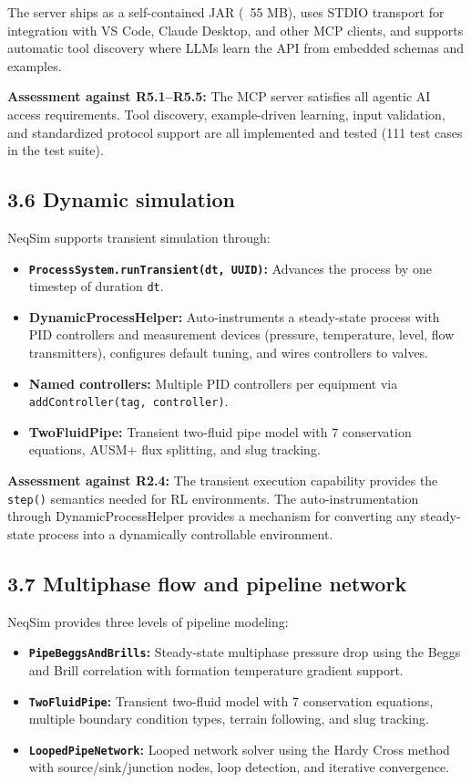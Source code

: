 \documentclass[review,3p]{custom}
\begin{document}
The server ships as a self-contained JAR (~55 MB), uses STDIO transport for integration with VS Code, Claude Desktop, and other MCP clients, and supports automatic tool discovery where LLMs learn the API from embedded schemas and examples.

\textbf{Assessment against R5.1--R5.5:} The MCP server satisfies all agentic AI access requirements. Tool discovery, example-driven learning, input validation, and standardized protocol support are all implemented and tested (111 test cases in the test suite).

\subsection{3.6 Dynamic simulation}

NeqSim supports transient simulation through:

\begin{itemize}
  \item \textbf{\texttt{ProcessSystem.runTransient(dt, UUID)}:} Advances the process by one timestep of duration \texttt{dt}.
  \item \textbf{DynamicProcessHelper:} Auto-instruments a steady-state process with PID controllers and measurement devices (pressure, temperature, level, flow transmitters), configures default tuning, and wires controllers to valves.
  \item \textbf{Named controllers:} Multiple PID controllers per equipment via \texttt{addController(tag, controller)}.
  \item \textbf{TwoFluidPipe:} Transient two-fluid pipe model with 7 conservation equations, AUSM+ flux splitting, and slug tracking.
\end{itemize}

\textbf{Assessment against R2.4:} The transient execution capability provides the \texttt{step()} semantics needed for RL environments. The auto-instrumentation through DynamicProcessHelper provides a mechanism for converting any steady-state process into a dynamically controllable environment.

\subsection{3.7 Multiphase flow and pipeline network}

NeqSim provides three levels of pipeline modeling:

\begin{itemize}
  \item \textbf{\texttt{PipeBeggsAndBrills}:} Steady-state multiphase pressure drop using the Beggs and Brill correlation \cite{BeggsBrill1973} with formation temperature gradient support.
  \item \textbf{\texttt{TwoFluidPipe}:} Transient two-fluid model with 7 conservation equations, multiple boundary condition types, terrain following, and slug tracking.
  \item \textbf{\texttt{LoopedPipeNetwork}:} Looped network solver using the Hardy Cross method \cite{Cross1936} with source/sink/junction nodes, loop detection, and iterative convergence.
\end{itemize}
\end{document}
